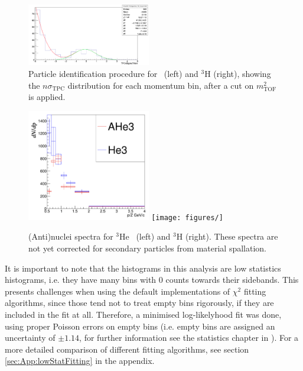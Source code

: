 \begin{figure}
    \includegraphics[width=0.48\textwidth]{figures/triton/Triton_TPCnSigma_Bin4.png}
    \caption{Particle identification procedure for \atrit\ (left) and $^3\mathrm{H}$ (right), showing the $n\sigma_{\mathrm{TPC}}$ distribution for each momentum bin, after a cut on $m_{\mathrm{TOF}}^2$ is applied.}
    \label{fig:h3_TPC_PID}
\end{figure}

\begin{figure}
    \centering
    \includegraphics[width=0.48\textwidth]{figures/he3_spectra.png}
    \texttt{[image: figures/]}
    \caption{(Anti)nuclei spectra for $^3\mathrm{He}$ \ahe\ (left) and $^3\mathrm{H}$ \atrit (right). These spectra are not yet corrected for secondary particles from material spallation.}
    \label{fig:(anti)nucleiSpectra}
\end{figure}


\begin{table}
\end{table}

It is important to note that the histograms in this analysis are low statistics histograms, i.e. they have many bins with 0 counts towards their sidebands. This presents challenges when using the default implementations of $\chi^2$ fitting algorithms, since those tend not to treat empty bins rigorously, if they are included in the fit at all. Therefore, a minimised log-likelyhood fit was done, using proper Poisson errors on empty bins (i.e. empty bins are assigned an uncertainty of $\pm 1.14$, for further information see the statistics chapter in \cite{PDG2022}). For a more detailed comparison of different fitting algorithms, see section \ref{sec:App:lowStatFitting} in the appendix.

